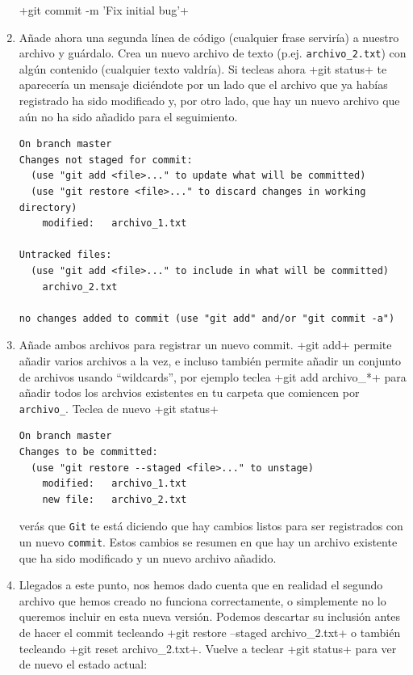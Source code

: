 \documentclass[a5paper, oneside,10pt]{article}
\begin{document}
\begin{enumerate}
    \cverb+git commit -m 'Fix initial bug'+
    
    \item Añade ahora una segunda línea de código (cualquier frase serviría) a nuestro archivo y guárdalo. Crea un nuevo archivo de texto (p.ej. \verb+archivo_2.txt+) con algún contenido (cualquier texto valdría). Si tecleas ahora \cverb+git status+ te aparecería un mensaje diciéndote por un lado que el archivo que ya habías registrado ha sido modificado y, por otro lado, que hay un nuevo archivo que aún no ha sido añadido para el seguimiento.
    
    \begin{lstlisting}[style=custom]
On branch master
Changes not staged for commit:
  (use "git add <file>..." to update what will be committed)
  (use "git restore <file>..." to discard changes in working directory)
	modified:   archivo_1.txt

Untracked files:
  (use "git add <file>..." to include in what will be committed)
	archivo_2.txt

no changes added to commit (use "git add" and/or "git commit -a")
    \end{lstlisting}
    
    \item Añade ambos archivos para registrar un nuevo commit.  \cverb+git add+ permite añadir varios archivos a la vez, e incluso también permite añadir un conjunto de archivos usando ``wildcards'', por ejemplo teclea \cverb+git add archivo_*+ para añadir todos los archvios existentes en tu carpeta que comiencen por \verb+archivo_+. Teclea de nuevo \cverb+git status+
    
    \begin{lstlisting}[style=custom]
On branch master
Changes to be committed:
  (use "git restore --staged <file>..." to unstage)
	modified:   archivo_1.txt
	new file:   archivo_2.txt
    \end{lstlisting}    
    verás que \verb+Git+ te está diciendo que hay cambios listos para ser registrados con un nuevo \verb+commit+. Estos cambios se resumen en que hay un archivo existente que ha sido modificado y un nuevo archivo añadido.
    
    \item Llegados a este punto, nos hemos dado cuenta que en realidad el segundo archivo que hemos creado no funciona correctamente, o simplemente no lo queremos incluir en esta nueva versión. Podemos descartar su inclusión antes de hacer el commit tecleando \cverb+git restore --staged archivo_2.txt+ o también tecleando \cverb+git reset archivo_2.txt+. Vuelve a teclear \cverb+git status+ para ver de nuevo el estado actual:
    

\end{enumerate}
\end{document}
